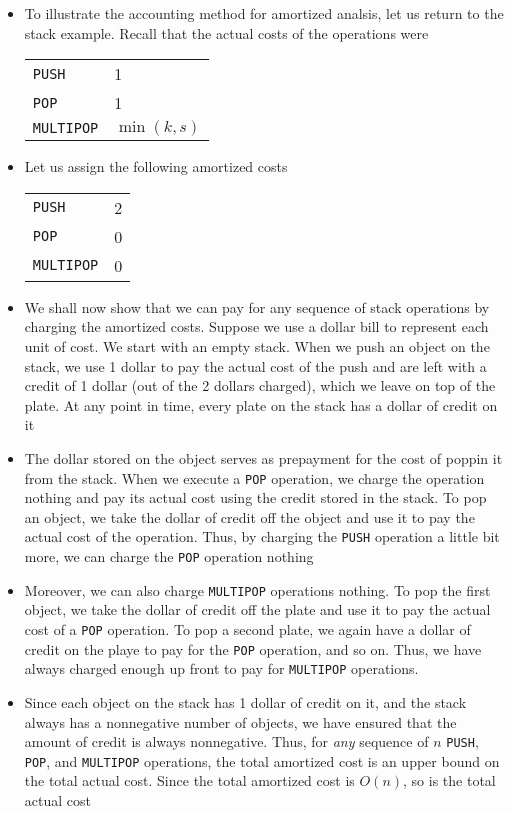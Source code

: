 \documentclass{report}
\begin{document}
\begin{itemize}
    \item To illustrate the accounting method for amortized analsis, let us return to the stack example. Recall that the actual costs of the operations were
    \begin{center}
        \begin{tabular}{ll}
            \texttt{PUSH} & 1 \\
            \texttt{POP} & 1 \\
            \texttt{MULTIPOP} & $\min(k, s)$
        \end{tabular}
    \end{center}
    \item Let us assign the following amortized costs
    \begin{center}
        \begin{tabular}{ll}
            \texttt{PUSH} & 2 \\
            \texttt{POP} & 0 \\
            \texttt{MULTIPOP} & 0
        \end{tabular}
    \end{center}
    \item We shall now show that we can pay for any sequence of stack operations by charging the amortized costs. Suppose we use a dollar bill to represent each unit of cost. We start with an empty stack. When we push an object on the stack, we use 1 dollar to pay the actual cost of the push and are left with a credit of 1 dollar (out of the 2 dollars charged), which we leave on top of the plate. At any point in time, every plate on the stack has a dollar of credit on it
    \item The dollar stored on the object serves as prepayment for the cost of poppin it from the stack. When we execute a \texttt{POP} operation, we charge the operation nothing and pay its actual cost using the credit stored in the stack. To pop an object, we take the dollar of credit off the object and use it to pay the actual cost of the operation. Thus, by charging the \texttt{PUSH} operation a little bit more, we can charge the \texttt{POP} operation nothing
    \item Moreover, we can also charge \texttt{MULTIPOP} operations nothing. To pop the first object, we take the dollar of credit off the plate and use it to pay the actual cost of a \texttt{POP} operation. To pop a second plate, we again have a dollar of credit on the playe to pay for the \texttt{POP} operation, and so on. Thus, we have always charged enough up front to pay for \texttt{MULTIPOP} operations.
    \item Since each object on the stack has 1 dollar of credit on it, and the stack always has a nonnegative number of objects, we have ensured that the amount of credit is always nonnegative. Thus, for \textit{any} sequence of $n$ \texttt{PUSH}, \texttt{POP}, and \texttt{MULTIPOP} operations, the total amortized cost is an upper bound on the total actual cost. Since the total amortized cost is $O(n)$, so is the total actual cost
\end{itemize}
\end{document}
